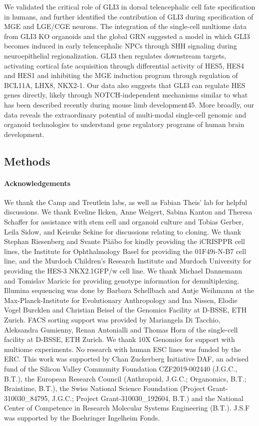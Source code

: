 We validated the critical role of GLI3 in dorsal telencephalic cell fate specification in humans, and further identified the contribution of GLI3 during specification of MGE and LGE/CGE neurons. The integration of the single-cell multiome data from GLI3 KO organoids and the global GRN suggested a model in which GLI3 becomes induced in early telencephalic NPCs through SHH signaling during neuroepithelial regionalization. GLI3 then regulates downstream targets, activating cortical fate acquisition through differential activity of HES5, HES4 and HES1 and inhibiting the MGE induction program through regulation of BCL11A, LHX8, NKX2-1. Our data also suggests that GLI3 can regulate HES genes directly, likely through NOTCH-independent mechanisms similar to what has been described recently during mouse limb development45. More broadly, our data reveals the extraordinary potential of multi-modal single-cell genomic and organoid technologies to understand gene regulatory programs of human brain development.


\subsection{Methods}

\paragraph{Acknowledgements}
We thank the Camp and Treutlein labs, as well as Fabian Theis’ lab for helpful discussions. We thank Eveline Ilcken, Anne Weigert, Sabina Kanton and Theresa Schaffer for assistance with stem cell and organoid culture and Tobias Gerber, Leila Sidow, and Keisuke Sekine for discussions relating to cloning. We thank Stephan Riesenberg and Svante Pääbo for kindly providing the iCRISPPR cell lines, the Institute for Ophthalmology Basel for providing the 01F49i-N-B7 cell line, and the Murdoch Children's Research Institute and Murdoch University for providing the HES-3 NKX2.1GFP/w cell line. We thank Michael Dannemann and Tomislav Maricic for providing genotype information for demultiplexing. Illumina sequencing was done by Barbara Schellbach and Antje Weihmann at the Max-Planck-Institute for Evolutionary Anthropology and Ina Nissen, Elodie Vogel Burcklen and Christian Beisel of the Genomics Facility at D-BSSE, ETH Zurich. FACS sorting support was provided by Mariangela Di Tacchio, Aleksandra Gumienny, Renan Antonialli and Thomas Horn of the single-cell facility at D-BSSE, ETH Zurich. We thank 10X Genomics for support with multiome experiments. No research with human ESC lines was funded by the ERC. This work was supported by Chan Zuckerberg Initiative DAF, an advised fund of the Silicon Valley Community Foundation CZF2019-002440 (J.G.C., B.T.), the European Research Council (Anthropoid, J.G.C.; Organomics, B.T.; Braintime, B.T.), the Swiss National Science Foundation (Project Grant-310030\_84795, J.G.C.; Project Grant-310030\_192604, B.T.) and the National Center of Competence in Research Molecular Systems Engineering (B.T.). J.S.F was supported by the Boehringer Ingelheim Fonds.
 
